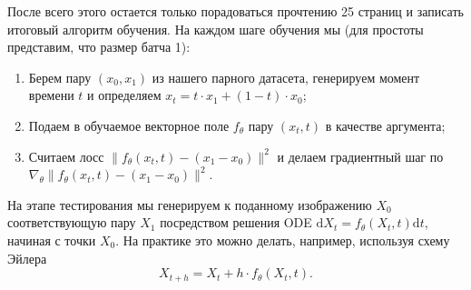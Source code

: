 \documentclass[12pt]{article}
\theoremstyle{definition}
\begin{document}
После всего этого остается только порадоваться прочтению 25 страниц и записать итоговый алгоритм обучения. На каждом шаге обучения мы (для простоты представим, что размер батча 1):
\begin{enumerate}
    \item Берем пару $(x_0, x_1)$ из нашего парного датасета, генерируем момент времени $t$ и определяем $x_t = t \cdot x_1 + (1 - t) \cdot x_0$;
    \item Подаем в обучаемое векторное поле $f_\theta$ пару $(x_t, t)$ в качестве аргумента;
    \item Считаем лосс $\|f_\theta(x_t, t) - (x_1 - x_0) \|^2$ и делаем градиентный шаг по $\nabla_\theta\|f_\theta(x_t, t) - (x_1 - x_0) \|^2$.
\end{enumerate}

На этапе тестирования мы генерируем к поданному изображению $X_0$ соответствующую пару $X_1$ посредством решения ODE $\mathrm{d} X_t = f_\theta(X_t, t) \mathrm{d} t$, начиная с точки $X_0$. На практике это можно делать, например, используя схему Эйлера
\[
    X_{t + h} = X_t + h \cdot f_\theta(X_t, t).
\]

\newpage


\end{document}
